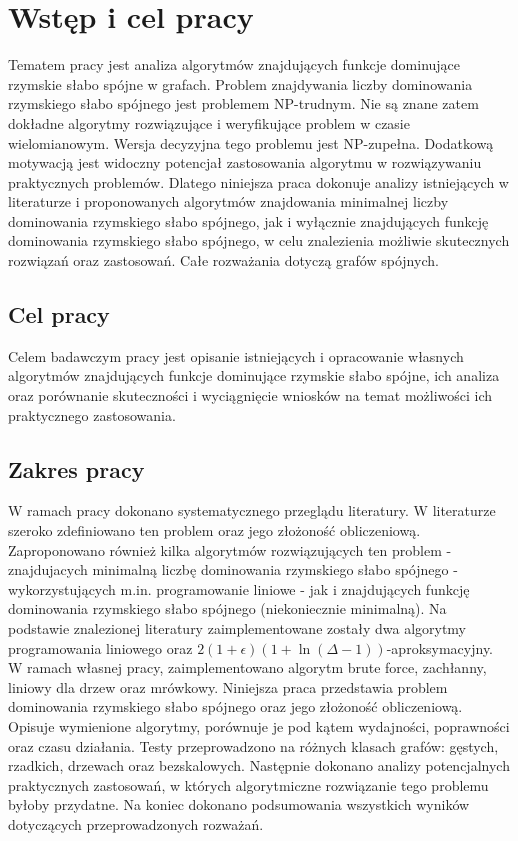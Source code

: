 \chapter{Wstęp i cel pracy}
Tematem pracy jest analiza algorytmów znajdujących funkcje dominujące rzymskie słabo spójne w grafach.
Problem znajdywania liczby dominowania rzymskiego słabo spójnego jest problemem NP-trudnym. Nie są znane zatem dokładne algorytmy rozwiązujące i weryfikujące problem w czasie wielomianowym. Wersja decyzyjna tego problemu jest NP-zupełna. Dodatkową motywacją jest widoczny potencjał zastosowania algorytmu w rozwiązywaniu praktycznych problemów. Dlatego niniejsza praca dokonuje analizy istniejących w literaturze i proponowanych algorytmów znajdowania minimalnej liczby dominowania rzymskiego słabo spójnego, jak i wyłącznie znajdujących funkcję dominowania rzymskiego słabo spójnego, w celu znalezienia możliwie skutecznych rozwiązań oraz zastosowań. Całe rozważania dotyczą grafów spójnych.

\section{Cel pracy}
Celem badawczym pracy jest opisanie istniejących i opracowanie własnych algorytmów znajdujących funkcje dominujące rzymskie słabo spójne, ich analiza oraz porównanie skuteczności i wyciągnięcie wniosków na temat możliwości ich praktycznego zastosowania.

\section{Zakres pracy}
W ramach pracy dokonano systematycznego przeglądu literatury. W literaturze szeroko zdefiniowano ten problem oraz jego złożoność obliczeniową. Zaproponowano również kilka algorytmów rozwiązujących ten problem - znajdujacych minimalną liczbę dominowania rzymskiego słabo spójnego - wykorzystujących m.in. programowanie liniowe - jak i znajdujących funkcję dominowania rzymskiego słabo spójnego (niekoniecznie minimalną). Na podstawie znalezionej literatury zaimplementowane zostały dwa algorytmy programowania liniowego oraz $2(1+\epsilon)(1 + \ln(\Delta - 1))$-aproksymacyjny. W ramach własnej pracy, zaimplementowano algorytm brute force, zachłanny, liniowy dla drzew oraz mrówkowy. Niniejsza praca przedstawia problem dominowania rzymskiego słabo spójnego oraz jego złożoność obliczeniową. Opisuje wymienione algorytmy, porównuje je pod kątem wydajności, poprawności oraz czasu działania. Testy przeprowadzono na różnych klasach grafów: gęstych, rzadkich, drzewach oraz bezskalowych. Następnie dokonano analizy potencjalnych praktycznych zastosowań, w których algorytmiczne rozwiązanie tego problemu byłoby przydatne. Na koniec dokonano podsumowania wszystkich wyników dotyczących przeprowadzonych rozważań.